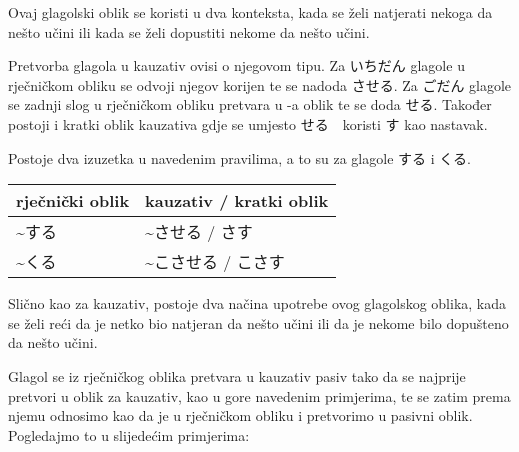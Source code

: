 
\author{Kristijan Čavić}

	
	Ovaj glagolski oblik se koristi u dva konteksta, kada se želi natjerati nekoga da nešto učini ili kada se želi dopustiti nekome da nešto učini.
	
	Pretvorba glagola u kauzativ ovisi o njegovom tipu.
	Za いちだん glagole u rječničkom obliku se odvoji njegov korijen te se nadoda させる.
	Za ごだん glagole se zadnji slog u rječničkom obliku pretvara u -a oblik te se doda せる.
	Također postoji i kratki oblik kauzativa gdje se umjesto せる　koristi す kao nastavak.
	
	\begin{reibun}
	\end{reibun}
	
	Postoje dva izuzetka u navedenim pravilima, a to su za glagole する i くる.
	\begin{table}[h]
		\centering
		\begin{tabular}{l l}\toprule[2pt]
			rječnički oblik & kauzativ / kratki oblik\\
			\midrule
			\textasciitilde する　& \textasciitilde させる / さす\\
			\textasciitilde くる　&\textasciitilde こさせる / こさす\\
			\bottomrule[2pt]
		\end{tabular}
	\end{table}
	
	
		
	Slično kao za kauzativ, postoje dva načina upotrebe ovog glagolskog oblika, kada se želi reći da je netko bio natjeran da nešto učini ili da je nekome bilo dopušteno da nešto učini.
	
	Glagol se iz rječničkog oblika pretvara u kauzativ pasiv tako da se najprije pretvori u oblik za kauzativ, kao u gore navedenim primjerima, te se zatim prema njemu odnosimo kao da je u rječničkom obliku i pretvorimo u pasivni oblik. Pogledajmo to u slijedećim primjerima:\\
 
